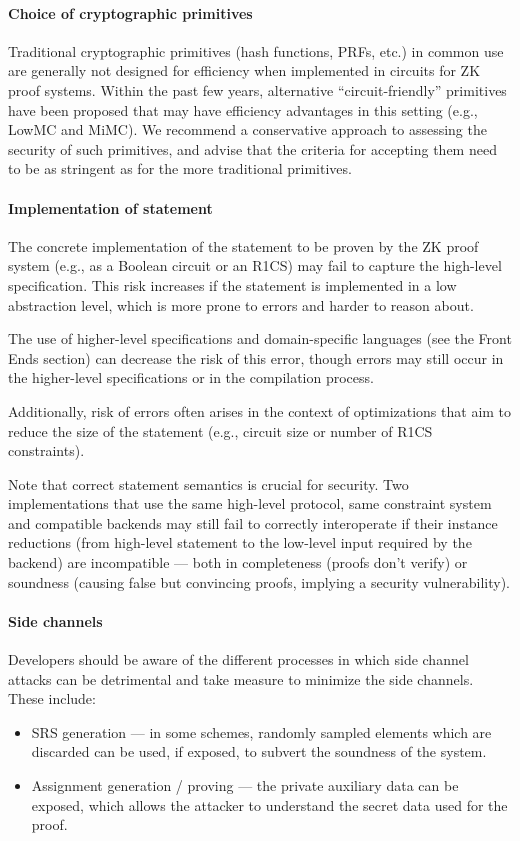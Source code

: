 \paragraph{Choice of cryptographic primitives}
Traditional cryptographic primitives (hash functions, PRFs, etc.) in common use are generally not designed for efficiency when implemented in circuits for ZK proof systems.
Within the past few years, alternative ``circuit-friendly'' primitives have been proposed that may have efficiency advantages in this setting (e.g., LowMC and MiMC).
We recommend a conservative approach to assessing the security of such primitives, and advise that the criteria for accepting them need to be as stringent as for the more traditional primitives.


\paragraph{Implementation of statement}
The concrete implementation of the statement to be proven by the ZK proof system (e.g., as a Boolean circuit or an R1CS) may fail to capture the high-level specification.
This risk increases if the statement is implemented in a low abstraction level, which is more prone to errors and harder to reason about.

The use of higher-level specifications and domain-specific languages (see the Front Ends section) can decrease the risk of this error, though errors may still occur in the higher-level specifications or in the compilation process.

Additionally, risk of errors often arises in the context of optimizations that aim to reduce the size of the statement (e.g., circuit size or number of R1CS constraints).

Note that correct statement semantics is crucial for security.
Two implementations that use the same high-level protocol, same constraint system and compatible backends may still fail to correctly interoperate if their instance reductions (from high-level statement to the low-level input required by the backend) are incompatible --- both in completeness (proofs don't verify) or soundness (causing false but convincing proofs, implying a security vulnerability).


\paragraph{Side channels}
Developers should be aware of the different processes in which side channel attacks can be detrimental and take measure to minimize the side channels.
These include:
\begin{itemize}
    \item SRS generation --- in some schemes, randomly sampled elements which are discarded can be used, if exposed, to subvert the soundness of the system.
    \item Assignment generation / proving --- the private auxiliary data can be exposed, which allows the attacker to understand the secret data used for the proof.
\end{itemize}


